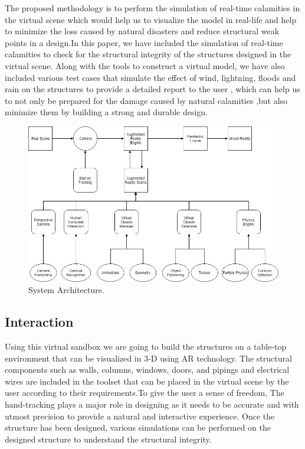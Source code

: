 \documentclass[conference]{IEEEtran}
\begin{document}
The proposed methodology is to perform the simulation of real-time calamities in the virtual scene which would help us to visualize the model in real-life and help to minimize the loss caused by natural disasters and reduce structural weak points in a design.In this paper, we have included the simulation of real-time calamities to check for the structural
integrity of the structures designed in the virtual scene. Along with the tools to construct a virtual model, we have also included various test cases that simulate the effect of wind, lightning, floods and rain on the structures to provide a detailed report to the user , which can help
us to not only be prepared for the damage caused by natural calamities ,but also minimize them by building a strong and durable design.

\begin{figure}
	\includegraphics[width=\linewidth]{architecture.jpg}
	\caption{System Architecture.}
	\label{fig:system-architecture}
\end{figure}
\subsection{Interaction}
Using this virtual sandbox we are going to build the structures on a table-top environment that can be visualized in 3-D using AR technology. The structural components such as walls, columns, windows, doors, and pipings and electrical wires are included in the toolset that can be placed in the virtual scene by the user according to their requirements.To give the user a sense of freedom, The hand-tracking plays a major role in designing as it needs to be accurate and with utmost precision to provide a natural and interactive experience. Once the structure has been designed, various
simulations can be performed on the designed structure to understand the structural integrity.
\end{document}
